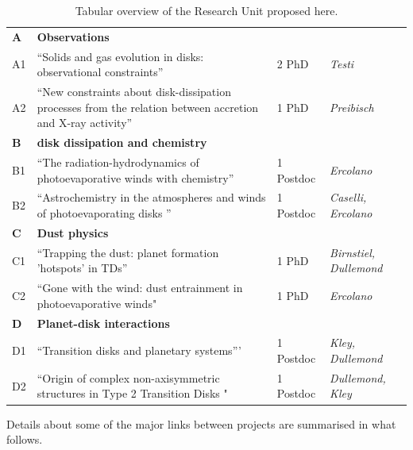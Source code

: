 \documentclass[10pt,fleqn,twoside]{article}
\newcommand{\AreacolA}{\color{blue}}
\newcommand{\AreacolB}{\color{Green}}
\newcommand{\AreacolC}{\color{YellowOrange}}
\newcommand{\AreacolD}{\color{Red}}
\begin{document}
\begin{table}
\noindent
\begin{tabular}{p{0.7cm}p{8cm}p{2.0cm}p{3.3cm}}
\hline
{\bf\AreacolA A} & {\bf\AreacolA Observations} & & \\ 
A1 & ``Solids and gas evolution in disks: observational constraints'' & 2 PhD & {\em Testi}\\
A2 & ``New constraints about disk-dissipation processes from the relation between accretion and X-ray activity'' & 1 PhD & {\em Preibisch}\\
\hline
{\bf\AreacolB B} & {\bf\AreacolB disk dissipation and chemistry} & & \\ 
B1 & ``The radiation-hydrodynamics of photoevaporative winds with chemistry'' & 1 Postdoc & {\em Ercolano}\\
B2 & ``Astrochemistry in the atmospheres and winds of photoevaporating disks '' & 1 Postdoc & {\em
                                                              Caselli,
                                                              Ercolano}\\
\hline
{\bf\AreacolC C} & {\bf\AreacolC Dust physics} & & \\ 
C1 & ``Trapping the dust: planet formation 'hotspots' in TDs'' & 1 PhD
                               & {\em Birnstiel, Dullemond}\\
C2 & ``Gone with the wind: dust entrainment in photoevaporative winds"& 1 PhD & {\em
                                                              Ercolano}\\
\hline
{\bf\AreacolD D} & {\bf\AreacolD Planet-disk interactions} & & \\ 
D1 & ``Transition disks and planetary systems''' & 1 Postdoc & {\em Kley, Dullemond}\\
D2 & ``Origin of complex non-axisymmetric structures in Type 2
     Transition Disks "& 1 Postdoc & {\em Dullemond, Kley}\\
\hline
\end{tabular}
\caption{\label{table-overview-ru}
Tabular overview of the Research Unit proposed here.}
\end{table}



Details about some of the major links between
projects are summarised in what follows.\\
\end{document}

